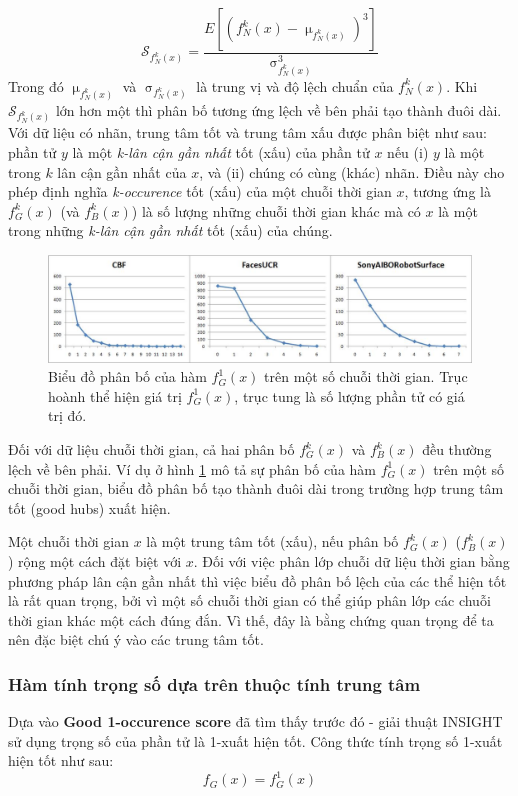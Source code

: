 \documentclass[13pt,oneside]{scrbook}
\begin{document}
\begin{equation}
\mathscr{S}_{f^k_N(x)} = \frac{E[(f^k_N(x) - \upmu_{f^k_N(x)})^3]}{\upsigma^3_{f^k_N(x)}}
\end{equation}
Trong đó $\upmu_{f^k_N(x)}$ và $\upsigma_{f^k_N(x)}$ là trung vị và độ lệch chuẩn của $f^k_N(x)$.
Khi $\mathscr{S}_{f^k_N(x)}$ lớn hơn một thì phân bố tương ứng lệch về bên phải tạo thành đuôi dài.
Với dữ liệu có nhãn, trung tâm tốt và trung tâm xấu được phân biệt như sau: phần tử $y$ là một \textit{k-lân cận gần nhất} tốt (xấu) của phần tử $x$ nếu (i) $y$ là một trong $k$ lân cận gần nhất của $x$, và (ii) chúng có cùng (khác) nhãn.
Điều này cho phép định nghĩa \textit{k-occurence} tốt (xấu) của một chuỗi thời gian $x$, tương ứng là $f^k_G(x)$ (và $f^k_B(x)$) là số lượng những chuỗi thời gian khác mà có $x$ là một trong những \textit{k-lân cận gần nhất} tốt (xấu) của chúng.
\begin{figure}[h!]
	\begin{center}
		\includegraphics[width=160mm]{INSIGHT_Distribution.png}
		\caption{Biểu đồ phân bố của hàm $f^1_G(x)$ trên một số chuỗi thời gian. Trục hoành thể hiện giá trị $f^1_G(x)$, trục tung là số lượng phần tử có giá trị đó.}
		\label{INSIGHT_Distribution.png}
	\end{center}
\end{figure}

Đối với dữ liệu chuỗi thời gian, cả hai phân bố $f^k_G(x)$ và $f^k_B(x)$ đều thường lệch về bên phải. Ví dụ ở hình \ref{INSIGHT_Distribution.png} mô tả sự phân bố của hàm $f^1_G(x)$ trên một số chuỗi thời gian, biểu đồ phân bố tạo thành đuôi dài trong trường hợp trung tâm tốt (good hubs) xuất hiện.


Một chuỗi thời gian $x$ là một trung tâm tốt (xấu), nếu phân bố $f^k_G(x)$ ($f^k_B(x)$) rộng một cách đặt biệt với $x$. Đối với việc phân lớp chuỗi dữ liệu thời gian bằng phương pháp lân cận gần nhất thì việc biểu đồ phân bố lệch của các thể hiện tốt là rất quan trọng, bởi vì một số chuỗi thời gian có thể giúp phân lớp các chuỗi thời gian khác một cách đúng đắn. Vì thế, đây là bằng chứng quan trọng để ta nên đặc biệt chú ý vào các trung tâm tốt.
\subsubsection{Hàm tính trọng số dựa trên thuộc tính trung tâm}
Dựa vào \textbf{Good 1-occurence score} đã tìm thấy trước đó - giải thuật INSIGHT sử dụng trọng số của phần tử là 1-xuất hiện tốt. Công thức tính trọng số 1-xuất hiện tốt như sau:
\begin{equation}
f_G(x) = f^1_G(x)
\end{equation}
\end{document}
